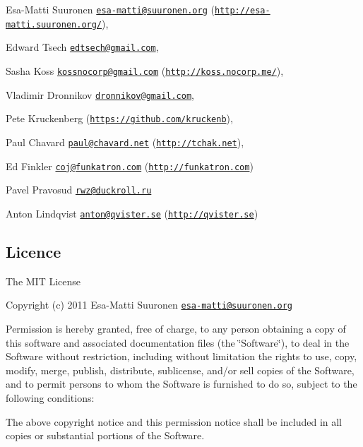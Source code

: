 \begin{DoxyItemize}
\item Esa-\/\+Matti Suuronen \href{mailto:esa-matti@suuronen.org}{\tt esa-\/matti@suuronen.\+org} (\href{http://esa-matti.suuronen.org/}{\tt http\+://esa-\/matti.\+suuronen.\+org/}),
\item Edward Tsech \href{mailto:edtsech@gmail.com}{\tt edtsech@gmail.\+com},
\item Sasha Koss \href{mailto:kossnocorp@gmail.com}{\tt kossnocorp@gmail.\+com} (\href{http://koss.nocorp.me/}{\tt http\+://koss.\+nocorp.\+me/}),
\item Vladimir Dronnikov \href{mailto:dronnikov@gmail.com}{\tt dronnikov@gmail.\+com},
\item Pete Kruckenberg (\href{https://github.com/kruckenb}{\tt https\+://github.\+com/kruckenb}),
\item Paul Chavard \href{mailto:paul@chavard.net}{\tt paul@chavard.\+net} (\href{http://tchak.net}{\tt http\+://tchak.\+net}),
\item Ed Finkler \href{mailto:coj@funkatron.com}{\tt coj@funkatron.\+com} (\href{http://funkatron.com}{\tt http\+://funkatron.\+com})
\item Pavel Pravosud \href{mailto:rwz@duckroll.ru}{\tt rwz@duckroll.\+ru}
\item Anton Lindqvist \href{mailto:anton@qvister.se}{\tt anton@qvister.\+se} (\href{http://qvister.se}{\tt http\+://qvister.\+se})
\end{DoxyItemize}

\subsection*{Licence}

The M\+IT License

Copyright (c) 2011 Esa-\/\+Matti Suuronen \href{mailto:esa-matti@suuronen.org}{\tt esa-\/matti@suuronen.\+org}

Permission is hereby granted, free of charge, to any person obtaining a copy of this software and associated documentation files (the \char`\"{}\+Software\char`\"{}), to deal in the Software without restriction, including without limitation the rights to use, copy, modify, merge, publish, distribute, sublicense, and/or sell copies of the Software, and to permit persons to whom the Software is furnished to do so, subject to the following conditions\+:

The above copyright notice and this permission notice shall be included in all copies or substantial portions of the Software.

